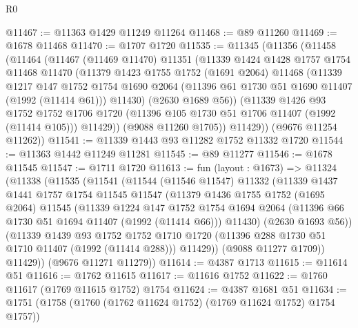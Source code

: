 \begin{lexlean}{R0}
\begin{coremodule}
@11467 := @11363 @1429 @11249 @11264
@11468 := @89 @11260
@11469 := @1678 @11468
@11470 := @1707 @1720
@11535 := @11345
    (@11356
      (@11458
        (@11464
          (@11467
            (@11469 @11470)
            @11351
            (@11339
              @1424
              @1428
              @1757
              @1754
              @11468
              @11470
              (@11379
                @1423
                @1755
                @1752
                (@1691 @2064)
                @11468
                (@11339
                  @1217
                  @147
                  @1752
                  @1754
                  @1690
                  @2064
                  (@11396 @61 @1730 @51 @1690 @11407 (@1992 (@11414 @61)))
                  @11430)
                (@2630 @1689 @56))
              (@11339
                @1426
                @93
                @1752
                @1752
                @1706
                @1720
                (@11396 @105 @1730 @51 @1706 @11407 (@1992 (@11414 @105)))
                @11429))
            (@9088 @11260 @1705))
          @11429))
      (@9676 @11254 @11262))
@11541 := @11339 @1443 @93 @11282 @1752 @11332 @1720
@11544 := @11363 @1442 @11249 @11281
@11545 := @89 @11277
@11546 := @1678 @11545
@11547 := @1711 @1720
@11613 := fun (layout : @1673) =>
  @11324
    (@11338
      (@11535
        (@11541
          (@11544
            (@11546 @11547)
            @11332
            (@11339
              @1437
              @1441
              @1757
              @1754
              @11545
              @11547
              (@11379
                @1436
                @1755
                @1752
                (@1695 @2064)
                @11545
                (@11339
                  @1224
                  @147
                  @1752
                  @1754
                  @1694
                  @2064
                  (@11396 @66 @1730 @51 @1694 @11407 (@1992 (@11414 @66)))
                  @11430)
                (@2630 @1693 @56))
              (@11339
                @1439
                @93
                @1752
                @1752
                @1710
                @1720
                (@11396 @288 @1730 @51 @1710 @11407 (@1992 (@11414 @288)))
                @11429))
            (@9088 @11277 @1709))
          @11429))
      (@9676 @11271 @11279))
@11614 := @4387 @1713
@11615 := @11614 @51
@11616 := @1762 @11615
@11617 := @11616 @1752
@11622 := @1760 @11617 (@1769 @11615 @1752) @1754
@11624 := @4387 @1681 @51
@11634 := @1751 (@1758 (@1760 (@1762 @11624 @1752) (@1769 @11624 @1752) @1754 @1757))

\end{coremodule}
\end{lexlean}
